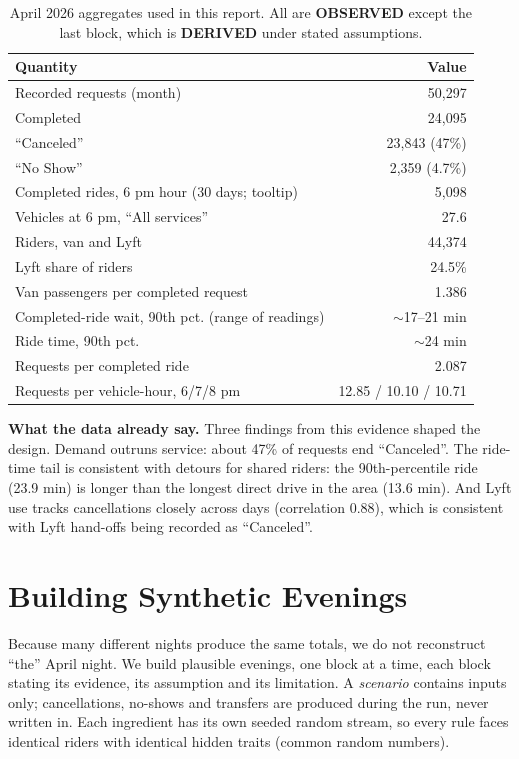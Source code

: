 \documentclass{article}
\newcommand{\lab}[1]{{\footnotesize\textsf{\textbf{#1}}}}
\newcommand{\OBS}{\lab{OBSERVED}}
\newcommand{\DER}{\lab{DERIVED}}
\begin{document}
\begin{table}[t]
\centering\small
\caption{April 2026 aggregates used in this report. All are \OBS{} except the last block, which is \DER{} under stated assumptions.}\label{tab:april}
\begin{tabularx}{\columnwidth}{@{}Lr@{}}
\toprule
\textbf{Quantity} & \textbf{Value}\\
\midrule
Recorded requests (month) & 50,297\\
Completed & 24,095\\
``Canceled'' & 23,843 (47\%)\\
``No Show'' & 2,359 (4.7\%)\\
Completed rides, 6 pm hour (30 days; tooltip) & 5,098\\
Vehicles at 6 pm, ``All services'' & 27.6\\
Riders, van and Lyft & 44,374\\
Lyft share of riders & 24.5\%\\
Van passengers per completed request & 1.386\\
Completed-ride wait, 90th pct. (range of readings) & $\sim$17--21 min\\
Ride time, 90th pct. & $\sim$24 min\\
\midrule
Requests per completed ride & 2.087\\
Requests per vehicle-hour, 6/7/8 pm & 12.85 / 10.10 / 10.71\\
\bottomrule
\end{tabularx}
\end{table}

\textbf{What the data already say.} Three findings from this evidence shaped the design. Demand outruns service: about 47\% of requests end ``Canceled''. The ride-time tail is consistent with detours for shared riders: the 90th-percentile ride (23.9 min) is longer than the longest direct drive in the area (13.6 min). And Lyft use tracks cancellations closely across days (correlation 0.88), which is consistent with Lyft hand-offs being recorded as ``Canceled''.

\section{Building Synthetic Evenings}\label{sec:scenario}

Because many different nights produce the same totals, we do not reconstruct ``the'' April night. We build plausible evenings, one block at a time, each block stating its evidence, its assumption and its limitation. A \emph{scenario} contains inputs only; cancellations, no-shows and transfers are produced during the run, never written in. Each ingredient has its own seeded random stream, so every rule faces identical riders with identical hidden traits (common random numbers).
\end{document}
